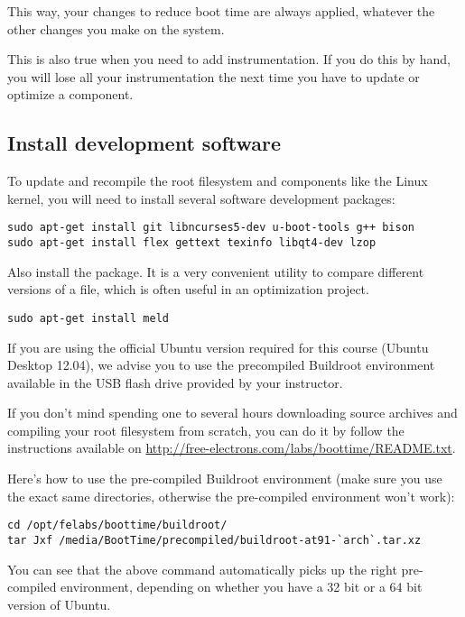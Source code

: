 This way, your changes to reduce boot time are always applied,
whatever the other changes you make on the system.

This is also true when you need to add instrumentation. If you do
this by hand, you will lose all your instrumentation the next
time you have to update or optimize a component.

\subsection{Install development software}

To update and recompile the root filesystem and
components like the Linux kernel, you will need to install several
software development packages:

\begin{verbatim}
sudo apt-get install git libncurses5-dev u-boot-tools g++ bison
sudo apt-get install flex gettext texinfo libqt4-dev lzop
\end{verbatim}

Also install the  package. It is a very
convenient utility to compare different versions of a file, which
is often useful in an optimization project.

\begin{verbatim}
sudo apt-get install meld
\end{verbatim}

If you are using the official Ubuntu version required for this course
(Ubuntu Desktop 12.04), we advise you to use the precompiled
Buildroot environment available in the USB flash drive provided by your
instructor.

If you don't mind spending one to several hours
downloading source archives and compiling your root filesystem from
scratch, you can do it by follow the instructions available on
\url{http://free-electrons.com/labs/boottime/README.txt}.

Here's how to use the pre-compiled Buildroot environment (make sure you
use the exact same directories, otherwise the pre-compiled environment
won't work):

\begin{verbatim}
cd /opt/felabs/boottime/buildroot/
tar Jxf /media/BootTime/precompiled/buildroot-at91-`arch`.tar.xz
\end{verbatim}

You can see that the above command automatically picks up the right
pre-compiled environment, depending on whether you have a 32 bit or
a 64 bit version of Ubuntu.

